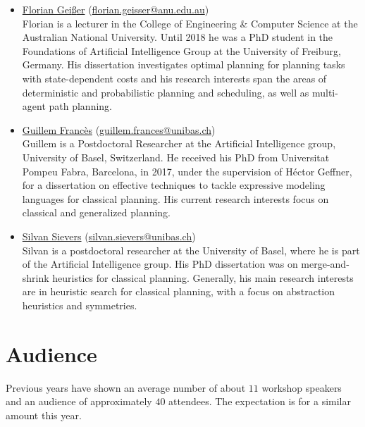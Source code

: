 \documentclass[10pt]{article}
\begin{document}
\begin{itemize}
\item \href{https://cecs.anu.edu.au/people/florian-geisser}{Florian Gei{\ss}er}
    (\href{mailto:florian.geisser@anu.edu.au}{florian.geisser@anu.edu.au})\\
        Florian is a lecturer in the College of Engineering \& Computer Science
        at the Australian National University. Until 2018 he was a PhD student
        in the Foundations of Artificial Intelligence Group at the University of
        Freiburg, Germany. His dissertation investigates optimal
        planning for planning tasks with state-dependent costs and his research
        interests span the areas of deterministic and probabilistic planning and
        scheduling, as well as multi-agent path planning.

\item \href{https://ai.dmi.unibas.ch/people/frances}{Guillem Franc\`{e}s}
    (\href{mailto:guillem.frances@unibas.ch}{guillem.frances@unibas.ch})\\
Guillem is a Postdoctoral Researcher at the Artificial Intelligence group, University of Basel, Switzerland.
He received his PhD from Universitat Pompeu Fabra, Barcelona, in 2017, under the supervision of H\'{e}ctor Geffner,
for a dissertation on effective techniques to tackle expressive modeling languages for classical planning.
His current research interests focus on classical and generalized planning.


\item \href{http://ai.cs.unibas.ch/people/}{Silvan Sievers}
  (\href{mailto:silvan.sievers@unibas.ch}{silvan.sievers@unibas.ch})\\
Silvan is a postdoctoral researcher at the University of Basel, where he is
part of the Artificial Intelligence group. His PhD dissertation was on
merge-and-shrink heuristics for classical planning. Generally, his main
research interests are in heuristic search for classical planning, with a focus
on abstraction heuristics and symmetries.



\end{itemize}

\section*{Audience}
Previous years have shown an average number of about $11$ workshop
speakers and an audience of approximately $40$ attendees. The
expectation is for a similar amount this year.
\end{document}

